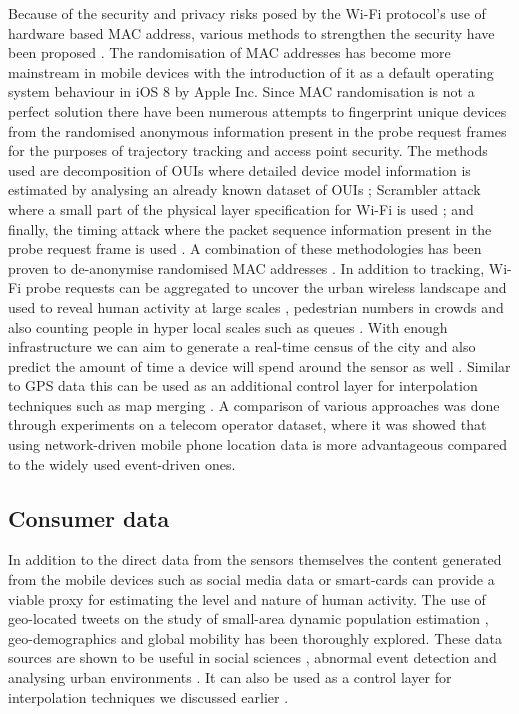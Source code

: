 Because of the security and privacy risks posed by the Wi-Fi protocol’s use of hardware based MAC address, various methods to strengthen the security have been proposed \citep{pang2007, greenstein2008}.
The randomisation of MAC addresses has become more mainstream in mobile devices with the introduction of it as a default operating system behaviour in iOS 8 by Apple Inc.
Since MAC randomisation is not a perfect solution \citep{mathieucunche2016} there have been numerous attempts to fingerprint unique devices from the randomised anonymous information present in the probe request frames for the purposes of trajectory tracking and access point security.
The methods used are decomposition of OUIs where detailed device model information is estimated by analysing an already known dataset of OUIs \cite{martin2016}; Scrambler attack where a small part of the physical layer specification for Wi-Fi is used \citep{bloessl2015}; and finally, the timing attack where the packet sequence information present in the probe request frame is used \citep{matte2016, cheng2016}.
A combination of these methodologies has been proven to de-anonymise randomised MAC addresses \citep{vanhoef2016}.
In addition to tracking, Wi-Fi probe requests can be aggregated to uncover the urban wireless landscape \citep{rose2010} and used to reveal human activity at large scales \citep{qin2013}, pedestrian numbers in crowds \citep{schauer2014, fukuzaki2015} and also counting people in hyper local scales such as queues \citep{wang2013}.
With enough infrastructure we can aim to generate a real-time census of the city \citep{kontokosta2016} and also predict the amount of time a device will spend around the sensor as well \citep{manweiler2013}.
Similar to GPS data this can be used as an additional control layer for interpolation techniques such as map merging \citep{erinc2013}.
A comparison of various approaches was done through experiments on a telecom operator dataset, where it was showed that using network-driven mobile phone location data is more advantageous compared to the widely used event-driven ones\cite[-3cm]{pinelli2015}.

\subsection{Consumer data}

In addition to the direct data from the sensors themselves the content generated from the mobile devices such as social media data or smart-cards \cite{zhong2016} can provide a viable proxy for estimating the level and nature of human activity.
The use of geo-located tweets on the study of small-area dynamic population estimation \citep{ordonez2012, marchetti2015, mckenzie2015, lansley2016a}, geo-demographics \citep{bawa-cavia2011, longley2015, lansley2016b} and global mobility \citep{hawelka2014} has been thoroughly explored.
These data sources are shown to be useful in social sciences \citep{crane2008}, abnormal event detection \citep{chae2012} and analysing urban environments \citep{sagl2012}.
It can also be used as a control layer for interpolation techniques we discussed earlier \citep{lin2015}.
